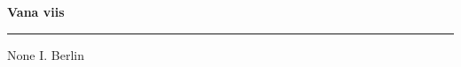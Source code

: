 \documentclass[10pt]{book}
\begin{document}
{
  \samepage
  \raggedbottom
  \raggedright
  \sloppy


  \vspace{0.2in}

  \noindent\begin{minipage}{.1\textwidth}
    \hfill\vspace{0.1in}
  \end{minipage}%
  \noindent\begin{minipage}{.8\textwidth}
    \centering
    \bfseries
    \large Vana viis
  \end{minipage}%
  \noindent\begin{minipage}{.1\textwidth}
      \hfill\vspace{0.1in}
  \end{minipage}

  \nopagebreak[4]
  \vspace{0.1in}
  \nopagebreak[4]
  \hrule height 0.05ex
  \nopagebreak[4]
  \vspace{-0.05in}

  {\footnotesize None \hfill I. Berlin }\\
  \vspace{0.01in}



}
\end{document}
